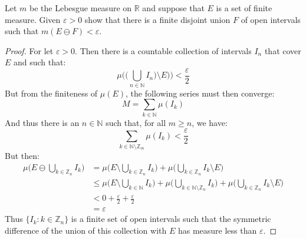 \documentclass[crop=false,class=article]{standalone}                           %
\begin{document}
        \begin{problem}
            Let $m$ be the Lebesgue measure on $\mathbb{R}$ and suppose that $E$
            is a set of finite measure. Given $\varepsilon>0$ show that there is
            a finite disjoint union $F$ of open intervals such that
            $m(E\ominus{F})<\varepsilon$.
        \end{problem}
        \begin{proof}
            For let $\varepsilon>0$. Then there is a countable collection of
            intervals $I_{n}$ that cover $E$ and such that:
            \begin{equation}
                \mu\Big(\big(\bigcup_{n\in\mathbb{N}}I_{n}\big)
                    \setminus{E}\big)\Big)
                <\frac{\varepsilon}{2}
            \end{equation}
            But from the finiteness of $\mu(E)$, the following series must then
            converge:
            \begin{equation}
                M=\sum_{k\in\mathbb{N}}\mu(I_{k})
            \end{equation}
            And thus there is an $n\in\mathbb{N}$ such that, for all $m\geq{n}$,
            we have:
            \begin{equation}
                \sum_{k\in\mathbb{N}\setminus\mathbb{Z}_{m}}\mu(I_{k})
                <\frac{\varepsilon}{2}
            \end{equation}
            But then:
            \begin{align}
                \mu\Big(E\ominus\bigcup_{k\in\mathbb{Z}_{n}}I_{k}\Big)
                &=\mu\Big(E\setminus\bigcup_{k\in\mathbb{Z}_{n}}I_{k}\Big)+
                    \mu\Big(\bigcup_{k\in\mathbb{Z}_{n}}I_{k}
                    \setminus{E}\Big)\\
                &\leq\mu\Big(E\setminus\bigcup_{k\in\mathbb{N}}I_{k}\Big)
                    +\mu\Big(\bigcup_{k\in\mathbb{N}
                    \setminus\mathbb{Z}_{n}}I_{k}\Big)
                    +\mu\Big(\bigcup_{k\in\mathbb{Z}_{n}}I_{k}
                    \setminus{E}\Big)\\
                &<0+\frac{\varepsilon}{2}
                    +\frac{\varepsilon}{2}\\
                &=\varepsilon
            \end{align}
            Thus $\{I_{k}:k\in\mathbb{Z}_{n}\}$ is a finite set of open
            intervals such that the symmetric difference of the union of this
            collection with $E$ has measure less than $\varepsilon$.
        \end{proof}
\end{document}
